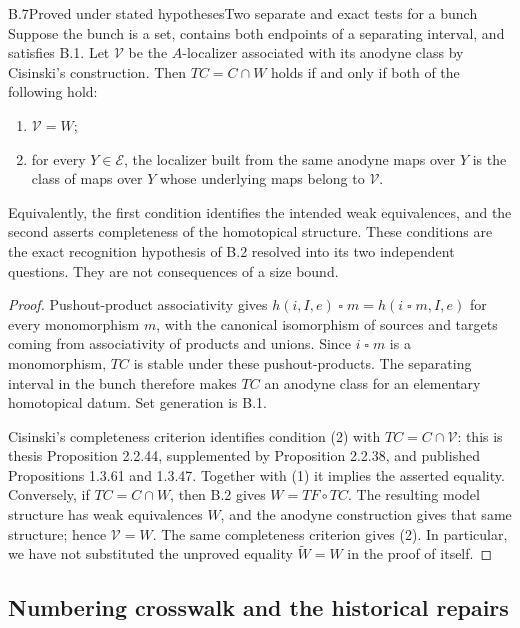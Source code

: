 \begin{claim}{B.7}{Proved under stated hypotheses}{Two separate and exact tests for a bunch}\label{B7}
Suppose the bunch is a set, contains both endpoints of a separating interval,
and satisfies B.1.  Let $\mathcal V$ be the $A$-localizer associated with its
anodyne class by Cisinski's construction.  Then $TC=C\cap W$ holds if and
only if both of the following hold:
\begin{enumerate}
\item $\mathcal V=W$;
\item for every $Y\in\mathscr E$, the localizer built from the same anodyne
maps over $Y$ is the class of maps over $Y$ whose underlying maps belong to
$\mathcal V$.
\end{enumerate}
Equivalently, the first condition identifies the intended weak equivalences,
and the second asserts completeness of the homotopical structure.  These
conditions are the exact recognition hypothesis of B.2 resolved into its
two independent questions.  They are not consequences of a size bound.
\end{claim}
\begin{proof}
Pushout-product associativity gives
$h(i,I,e)\mathbin{\square}m=h(i\mathbin{\square}m,I,e)$ for every
monomorphism $m$, with the canonical isomorphism of sources and targets
coming from associativity of products and unions.  Since $i\mathbin{\square}m$
is a monomorphism, $TC$ is stable under these pushout-products.  The
separating interval in the bunch therefore makes $TC$ an anodyne class for
an elementary homotopical datum.  Set generation is B.1.

Cisinski's completeness criterion identifies condition (2) with
$TC=C\cap\mathcal V$: this is thesis Proposition 2.2.44, supplemented by
Proposition 2.2.38, and published Propositions 1.3.61 and 1.3.47.
Together with (1) it implies the asserted equality.  Conversely, if
$TC=C\cap W$, then B.2 gives $W=TF\circ TC$.  The resulting model structure
has weak equivalences $W$, and the anodyne construction gives that same
structure; hence $\mathcal V=W$.  The same completeness criterion gives
(2).  In particular, we have not substituted the unproved equality
$\widetilde W=W$ in the proof of itself.
\end{proof}

\subsection{Numbering crosswalk and the historical repairs}

